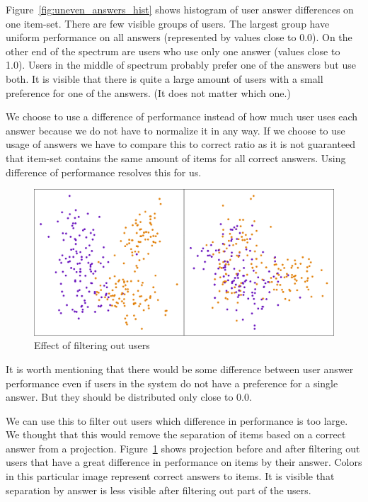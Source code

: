 \documentclass[
  printed, %
  table,   %
  nolof,     %
  nolot,     %
  color,
  final,
  nocover
]{fithesis3}
\begin{document}
Figure~\ref{fig:uneven_answers_hist} shows histogram of user answer differences on one item-set. There are few visible groups of users. The largest group have uniform performance on all answers (represented by values close to 0.0). On the other end of the spectrum are users who use only one answer (values close to 1.0). Users in the middle of spectrum probably prefer one of the answers but use both. It is visible that there is quite a large amount of users with a small preference for one of the answers. (It does not matter which one.)


We choose to use a difference of performance instead of how much user uses each answer because we do not have to normalize it in any way. If we choose to use usage of answers we have to compare this to correct ratio as it is not guaranteed that item-set contains the same amount of items for all correct answers. Using difference of performance resolves this for us.


\begin{figure}
  \includegraphics[width=\textwidth]{img/answers_normalization}
  \caption{Effect of filtering out users}
  \label{fig:answers_normalization}
\end{figure}

It is worth mentioning that there would be some difference between user answer performance even if users in the system do not have a preference for a single answer. But they should be distributed only close to 0.0.

We can use this to filter out users which difference in performance is too large. We thought that this would remove the separation of items based on a correct answer from a projection. Figure~\ref{fig:answers_normalization} shows projection before and after filtering out users that have a great difference in performance on items by their answer. Colors in this particular image represent correct answers to items. It is visible that separation by answer is less visible after filtering out part of the users.
\end{document}
